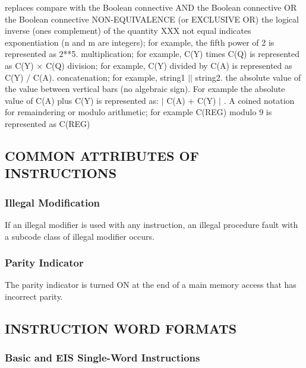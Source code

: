 {\inlbl {$\rightarrow$}
{replaces}
\inlbl {::}
{compare with}
\inlbl {\&}
{the Boolean connective AND}
\inlbl {$|$}
{the Boolean connective OR}
\inlbl {$\oplus$}
{the Boolean connective NON-EQUIVALENCE (or EXCLUSIVE OR)}
{the logical inverse (ones complement) of the quantity XXX}
\inlbl {$\neq$}
{not equal}
{indicates exponentiation (n and m are integers); for example, the fifth power of 2 is represented as 2**5.}
\inlbl {$\times$}
{multiplication; for example, C(Y) times C(Q) is represented as C(Y) $\times$ C(Q)}
\inlbl {/}
{division; for example, C(Y) divided by C(A) is represented as C(Y) / C(A).}
\inlbl {$||$}
{concatenation; for example, string1 $||$ string2.}
\inlbl {$|$\ldots$|$}
{the absolute value of the value between vertical bars (no algebraic sign). For example the absolute value of C(A) plus C(Y) is represented as: $|$ C(A) + C(Y) $|$ .}
{A coined notation for remaindering or modulo arithmetic; for example C(REG) modulo 9 is represented as C(REG)}




\subsection{COMMON ATTRIBUTES OF INSTRUCTIONS}

\subsubsection{Illegal Modification}

If an illegal modifier is used with any instruction, an illegal procedure fault with a subcode
class of illegal modifier occurs.

\subsubsection{Parity Indicator}

The parity indicator is turned ON at the end of a main memory access that has incorrect
parity.

\subsection{INSTRUCTION WORD FORMATS}

\subsubsection{Basic and EIS Single-Word Instructions}

}
